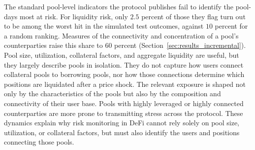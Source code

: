 \documentclass[a4paper,UKenglish,cleveref, autoref, thm-restate]{informs3}
\newcommand{\julnote}[1]{{\color{purple}{{\bf Julien:} #1}}}
\newcommand{\rev}[1]{{\color{purple}#1}}
\DeclareRobustCommand{\latestrev}[1]{{\color{red}\hypersetup{linkcolor=red,citecolor=red,urlcolor=red}#1}}
\begin{document}
 \rev{The \latestrev{standard pool-level} indicators the protocol publishes fail to identify the \latestrev{pool-days} most at risk. For liquidity risk, only $2.5$ percent of those they flag turn out to be among the worst hit \latestrev{in the simulated test outcomes}, against $10$ percent for a random ranking. Measures of the connectivity and concentration of a pool's counterparties raise this share to $60$ percent (Section~\ref{sec:results_incremental}).} Pool size, utilization, collateral factors, and aggregate liquidity are useful, but they largely describe pools in isolation. They do not capture how users connect collateral pools to borrowing pools, nor how those connections determine which positions are liquidated after a price shock. The relevant exposure is shaped not only by the characteristics of the pools but also by the composition and connectivity of their user base. Pools with highly leveraged or highly connected counterparties are more prone to transmitting stress across the protocol. These dynamics explain why risk monitoring in DeFi cannot rely solely on pool size, utilization, or collateral factors, but must also identify \latestrev{the users and positions connecting those pools}.

\end{document}
